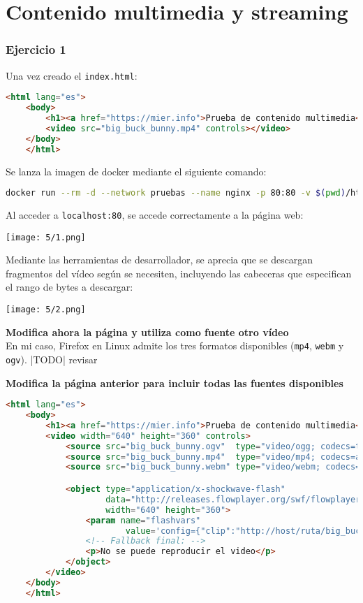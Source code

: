\chapter{Contenido multimedia y streaming}
\subsection{Ejercicio 1}
Una vez creado el \Verb#index.html#:
\begin{lstlisting}[language=html]
	<html lang="es">
	<body>
		<h1><a href="https://mier.info">Prueba de contenido multimedia</a></h1>
		<video src="big_buck_bunny.mp4" controls></video>
	</body>
	</html>
\end{lstlisting}

Se lanza la imagen de docker mediante el siguiente comando:
\begin{lstlisting}[language=bash]
	docker run --rm -d --network pruebas --name nginx -p 80:80 -v $(pwd)/html/video5/:/usr/share/nginx/html nginx
\end{lstlisting}

Al acceder a \Verb#localhost:80#, se accede correctamente a la página web: \\
\begin{minipage}{\linewidth}
	\centering
	\texttt{[image: 5/1.png]}
	\label{fig:5/1}
\end{minipage}

Mediante las herramientas de desarrollador, se aprecia que se descargan fragmentos del vídeo
según se necesiten, incluyendo las cabeceras que especifican el rango de bytes a descargar: \\
\begin{minipage}{\linewidth}
	\centering
	\texttt{[image: 5/2.png]}
	\label{fig:5/2}
\end{minipage}

\textbf{Modifica ahora la página y utiliza como fuente otro vídeo} \\
En mi caso, Firefox en Linux admite los tres formatos disponibles (\Verb#mp4#, \Verb#webm# y \Verb#ogv#).
|TODO| revisar

\textbf{Modifica la página anterior para incluir todas las fuentes disponibles}
\begin{lstlisting}[language=html]
	<html lang="es">
	<body>
		<h1><a href="https://mier.info">Prueba de contenido multimedia</a></h1>
		<video width="640" height="360" controls>
			<source src="big_buck_bunny.ogv"  type="video/ogg; codecs=theora">
			<source src="big_buck_bunny.mp4"  type="video/mp4; codecs=avc1.42E01E,mp4a.40.2">
			<source src="big_buck_bunny.webm" type="video/webm; codecs=vp8,vorbis">

			<object type="application/x-shockwave-flash"
					data="http://releases.flowplayer.org/swf/flowplayer-3.2.1.swf"
					width="640" height="360">
				<param name="flashvars"
						value='config={"clip":"http://host/ruta/big_buck_bunny.mp4"}'/>
				<!-- Fallback final: -->
				<p>No se puede reproducir el video</p>
			</object>
		</video>
	</body>
	</html>
\end{lstlisting}
\newpage{} %

